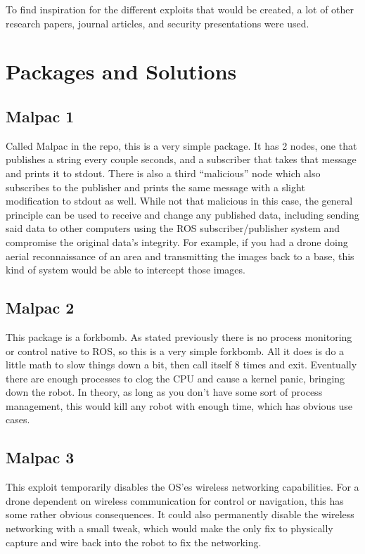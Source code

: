 \documentclass[IEEEtran,letterpaper,10pt,notitlepage,draftclsnofoot,onecolumn]{article}
\begin{document}
To find inspiration for the different exploits that would be created, a lot of other research papers, journal articles, and security presentations were used. 

\section{Packages and Solutions}
\subsection{Malpac 1}
Called Malpac in the repo, this is a very simple package. It has 2 nodes, one that publishes a string every couple seconds, and a subscriber that takes that message and prints it to stdout. 
There is also a third “malicious” node which also subscribes to the publisher and prints the same message with a slight modification to stdout as well. 
While not that malicious in this case, the general principle can be used to receive and change any published data, including sending said data to other computers using the ROS subscriber/publisher system and compromise the original data’s integrity. 
For example, if you had a drone doing aerial reconnaissance of an area and transmitting the images back to a base, this kind of system would be able to intercept those images.

\subsection{Malpac 2}
This package is a forkbomb. 
As stated previously there is no process monitoring or control native to ROS, so this is a very simple forkbomb. All it does is do a little math to slow things down a bit, then call itself 8 times and exit. 
Eventually there are enough processes to clog the CPU and cause a kernel panic, bringing down the robot. 
In theory, as long as you don’t have some sort of process management, this would kill any robot with enough time, which has obvious use cases.

\subsection{Malpac 3}
This exploit temporarily disables the OS’es wireless networking capabilities. 
For a drone dependent on wireless communication for control or navigation, this has some rather obvious consequences. 
It could also permanently disable the wireless networking with a small tweak, which would make the only fix to physically capture and wire back into the robot to fix the networking. 
\end{document}
